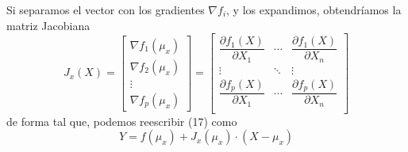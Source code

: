 \documentclass[a4paper, 10pt]{article}
\begin{document}
Si separamos el vector con los gradientes $\nabla f_i$, y los expandimos, obtendríamos la matriz Jacobiana
\begin{equation}
    J_x(X) = \begin{bmatrix}
        \nabla f_1\left(\mu_x\right) \\
        \nabla f_2\left(\mu_x\right) \\
        \vdots                       \\
        \nabla f_p\left(\mu_x\right)
    \end{bmatrix} = \begin{bmatrix}
        \dfrac{\partial f_1(X)}{\partial X_1} & \cdots & \dfrac{\partial f_1(X)}{\partial X_n} \\
        \vdots                                & \ddots & \vdots                                \\
        \dfrac{\partial f_p(X)}{\partial X_1} & \cdots & \dfrac{\partial f_p(X)}{\partial X_n} \\
    \end{bmatrix}
\end{equation}
de forma tal que, podemos reescribir (17) como
\begin{equation}
    Y = f(\mu_x) + J_x(\mu_x)\cdot (X-\mu_x)
\end{equation}
\end{document}
